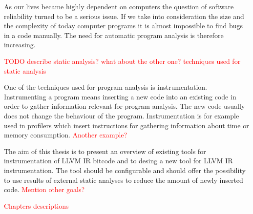 As our lives became highly dependent on computers the question of software
reliability turned to be a serious issue. If we take into consideration the
size and the complexity of today computer programs it is almost impossible to
find bugs in a code manually. The need for automatic program analysis is
therefore increasing.

\textcolor{red}{TODO describe static analysis? what about the other one?
techniques used for static analysis}

One of the techniques used for program analysis is instrumentation.
Instrumenting a program means inserting a new code into an existing code in
order to gather information relevant for program analysis. The new code usually
does not change the behaviour of the program. Instrumentation is for example
used in profilers which insert instructions for gathering information about
time or memory consumption. \textcolor{red}{Another example?}

The aim of this thesis is to present an overview of existing tools for
instrumentation of LLVM IR bitcode and to desing a new tool for LLVM IR
instrumentation. The tool should be configurable and should offer the
possibility to use results of external static analyses to reduce the amount of
newly inserted code. \textcolor{red}{Mention other goals?} 

\textcolor{red}{Chapters descriptions}
